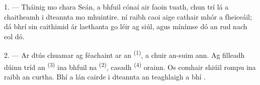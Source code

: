 %
%

\VUsaut{4.0mm}
\VUsaut{3.0mm}

\VUsaut{3.0mm}

1. --- Tháinig mo chara Seán, a bhfuil cónaí air faoin tuath, chun trí lá a chaitheamh
i dteannta mo mhuintire.  ní raibh caoi aige cathair mhór a
fheiceáil; dá bhrí sin caithimid ár laethanta go léir ag siúl, agus mínímse dó an rud
nach eol dó.

2. --- Ar dtús chuamar ag féachaint ar an  \textsuperscript{(1)}, a
chuir an-suim ann. Ag filleadh dúinn tríd an  \textsuperscript{(3)} ina
bhfuil na  \textsuperscript{(2)}, casadh 
\textsuperscript{(4)} orainn. Os comhair  shiúil
 rompu  ina raibh an 
curtha. Bhí a lán cairde i dteannta an teaghlaigh a bhí .

